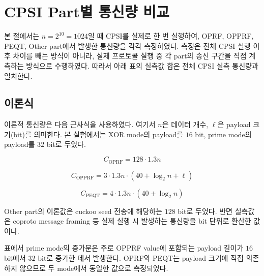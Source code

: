 \documentclass[11pt]{article}
\begin{document}


\clearpage
\section*{CPSI Part별 통신량 비교}

본 절에서는 \(n=2^{10}=1024\)일 때 CPSI를 실제로 한 번 실행하여,
OPRF, OPPRF, PEQT, Other part에서 발생한 통신량을 각각 측정하였다.
측정은 전체 CPSI 실행 이후 차이를 빼는 방식이 아니라, 실제 프로토콜 실행
중 각 part의 송신 구간을 직접 계측하는 방식으로 수행하였다. 따라서
아래 표의 실측값 합은 전체 CPSI 실측 통신량과 일치한다.

\subsection*{이론식}

이론적 통신량은 다음 근사식을 사용하였다. 여기서 \(n\)은 데이터 개수,
\(\ell\)은 payload 크기(bit)를 의미한다. 본 실험에서는 XOR mode의
payload를 \(16\) bit, prime mode의 payload를 \(32\) bit로 두었다.

\[
C_{\mathrm{OPRF}} = 128 \cdot 1.3n
\]

\[
C_{\mathrm{OPPRF}} = 3 \cdot 1.3n \cdot (40 + \log_2 n + \ell)
\]

\[
C_{\mathrm{PEQT}} = 4 \cdot 1.3n \cdot (40 + \log_2 n)
\]

Other part의 이론값은 cuckoo seed 전송에 해당하는 \(128\) bit로 두었다.
반면 실측값은 coproto message framing 등 실제 실행 시 발생하는 통신량을
bit 단위로 환산한 값이다.

\begin{table}[h]
\centering
\caption{Part별 이론 통신량과 XOR/prime mode 실측 통신량 비교
(\(n=2^{10}\), \(m=1305\), \(40+\log_2 m=51\) bit)}
\end{table}

표에서 prime mode의 증가분은 주로 OPPRF value에 포함되는 payload 길이가
\(16\) bit에서 \(32\) bit로 증가한 데서 발생한다. OPRF와 PEQT는 payload
크기에 직접 의존하지 않으므로 두 mode에서 동일한 값으로 측정되었다.
\end{document}
